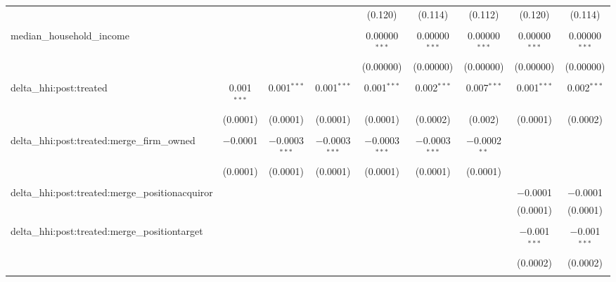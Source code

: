 \begin{table}[H]
{\begin{tabular}{@{\extracolsep{5pt}}lcccccccc}
   &  &  &  & (0.120) & (0.114) & (0.112) & (0.120) & (0.114) \\  

   & & & & & & & & \\  

  median\_household\_income &  &  &  & 0.00000$^{***}$ & 0.00000$^{***}$ & 0.00000$^{***}$ & 0.00000$^{***}$ & 0.00000$^{***}$ \\  

   &  &  &  & (0.00000) & (0.00000) & (0.00000) & (0.00000) & (0.00000) \\  

   & & & & & & & & \\  

  delta\_hhi:post:treated & 0.001$^{***}$ & 0.001$^{***}$ & 0.001$^{***}$ & 0.001$^{***}$ & 0.002$^{***}$ & 0.007$^{***}$ & 0.001$^{***}$ & 0.002$^{***}$ \\  

   & (0.0001) & (0.0001) & (0.0001) & (0.0001) & (0.0002) & (0.002) & (0.0001) & (0.0002) \\  

   & & & & & & & & \\  

  delta\_hhi:post:treated:merge\_firm\_owned & $-$0.0001 & $-$0.0003$^{***}$ & $-$0.0003$^{***}$ & $-$0.0003$^{***}$ & $-$0.0003$^{***}$ & $-$0.0002$^{**}$ &  &  \\  

   & (0.0001) & (0.0001) & (0.0001) & (0.0001) & (0.0001) & (0.0001) &  &  \\  

   & & & & & & & & \\  

  delta\_hhi:post:treated:merge\_positionacquiror &  &  &  &  &  &  & $-$0.0001 & $-$0.0001 \\  

   &  &  &  &  &  &  & (0.0001) & (0.0001) \\  

   & & & & & & & & \\  

  delta\_hhi:post:treated:merge\_positiontarget &  &  &  &  &  &  & $-$0.001$^{***}$ & $-$0.001$^{***}$ \\  

   &  &  &  &  &  &  & (0.0002) & (0.0002) \\  

   & & & & & & & & \\  


\end{tabular}}
\end{table}
